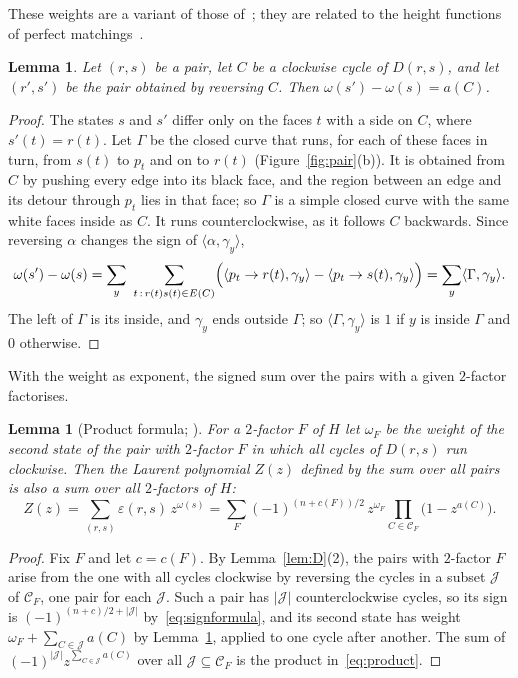 \documentclass[a4paper]{amsart}
\numberwithin{equation}{section}
\newtheorem{lemma}[equation]{Lemma}
\theoremstyle{definition}
\newcommand{\eps}{\varepsilon}
\newcommand{\cross}[2]{\langle #1,#2\rangle}
\newcommand{\cC}{\mathcal C}
\begin{document}
These weights are a variant of those of~\cite[Lemma~5.3]{OpenAI}; they are related to the height functions of perfect matchings~\cite{Thurston}.

\begin{lemma}\label{lem:weight}
Let $(r,s)$ be a pair, let $C$ be a clockwise cycle of $D(r,s)$, and let $(r',s')$ be the pair obtained by reversing $C$.
Then $\omega(s')-\omega(s)=a(C)$.
\end{lemma}

\begin{proof}
The states $s$ and $s'$ differ only on the faces $t$ with a side on $C$, where $s'(t)=r(t)$.
Let $\Gamma$ be the closed curve that runs, for each of these faces in turn, from $s(t)$ to $p_t$ and on to $r(t)$ (Figure~\ref{fig:pair}(b)).
It is obtained from $C$ by pushing every edge into its black face, and the region between an edge and its detour through $p_t$ lies in that face; so $\Gamma$ is a simple closed curve with the same white faces inside as $C$.
It runs counterclockwise, as it follows $C$ backwards.
Since reversing $\alpha$ changes the sign of $\cross{\alpha}{\gamma_y}$,
\[
\omega(s')-\omega(s)=\sum_y\ \sum_{t\,:\,r(t)s(t)\in E(C)}\Bigl(\cross{p_t\to r(t)}{\gamma_y}-\cross{p_t\to s(t)}{\gamma_y}\Bigr)=\sum_y\cross{\Gamma}{\gamma_y}.
\]
The left of $\Gamma$ is its inside, and $\gamma_y$ ends outside $\Gamma$; so $\cross{\Gamma}{\gamma_y}$ is $1$ if $y$ is inside $\Gamma$ and $0$ otherwise.
\end{proof}

With the weight as exponent, the signed sum over the pairs with a given $2$-factor factorises.

\begin{lemma}[Product formula; {\cite[(5.4)]{OpenAI}}]\label{lem:product}
For a $2$-factor $F$ of $H$ let $\omega_F$ be the weight of the second state of the pair with $2$-factor $F$ in which all cycles of $D(r,s)$ run clockwise.
Then the Laurent polynomial $Z(z)$ defined by the sum over all pairs is also a sum over all $2$-factors of $H$:
\begin{equation}\label{eq:product}
Z(z)=\sum_{(r,s)}\eps(r,s)\,z^{\omega(s)}=\sum_{F}(-1)^{(n+c(F))/2}\,z^{\omega_F}\prod_{C\in\cC_F}\bigl(1-z^{a(C)}\bigr).
\end{equation}
\end{lemma}

\begin{proof}
Fix $F$ and let $c=c(F)$.
By Lemma~\ref{lem:D}(2), the pairs with $2$-factor $F$ arise from the one with all cycles clockwise by reversing the cycles in a subset $\mathcal J$ of $\cC_F$, one pair for each $\mathcal J$.
Such a pair has $|\mathcal J|$ counterclockwise cycles, so its sign is $(-1)^{(n+c)/2+|\mathcal J|}$ by~\eqref{eq:signformula}, and its second state has weight $\omega_F+\sum_{C\in\mathcal J}a(C)$ by Lemma~\ref{lem:weight}, applied to one cycle after another.
The sum of $(-1)^{|\mathcal J|}z^{\sum_{C\in\mathcal J}a(C)}$ over all $\mathcal J\subseteq\cC_F$ is the product in~\eqref{eq:product}.
\end{proof}
\end{document}
